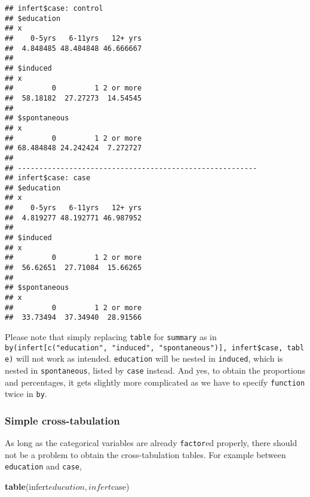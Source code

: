 \documentclass[]{book}
\newenvironment{Shaded}{\begin{snugshade}}{\end{snugshade}}
\newcommand{\KeywordTok}[1]{\textcolor[rgb]{0.13,0.29,0.53}{\textbf{{#1}}}}
\newcommand{\DecValTok}[1]{\textcolor[rgb]{0.00,0.00,0.81}{{#1}}}
\newcommand{\StringTok}[1]{\textcolor[rgb]{0.31,0.60,0.02}{{#1}}}
\newcommand{\NormalTok}[1]{{#1}}
\theoremstyle{definition}
\theoremstyle{definition}
\theoremstyle{remark}
\begin{document}
\begin{Shaded}
\end{Shaded}

\begin{verbatim}
## infert$case: control
## $education
## x
##    0-5yrs   6-11yrs   12+ yrs 
##  4.848485 48.484848 46.666667 
## 
## $induced
## x
##         0         1 2 or more 
##  58.18182  27.27273  14.54545 
## 
## $spontaneous
## x
##         0         1 2 or more 
## 68.484848 24.242424  7.272727 
## 
## -------------------------------------------------------- 
## infert$case: case
## $education
## x
##    0-5yrs   6-11yrs   12+ yrs 
##  4.819277 48.192771 46.987952 
## 
## $induced
## x
##         0         1 2 or more 
##  56.62651  27.71084  15.66265 
## 
## $spontaneous
## x
##         0         1 2 or more 
##  33.73494  37.34940  28.91566
\end{verbatim}

Please note that simply replacing \texttt{table} for \texttt{summary} as
in
\texttt{by(infert{[}c("education",\ "induced",\ "spontaneous"){]},\ infert\$case,\ table)}
will not work as intended. \texttt{education} will be nested in
\texttt{induced}, which is nested in \texttt{spontaneous}, listed by
\texttt{case} instead. And yes, to obtain the proportions and
percentages, it gets slightly more complicated as we have to specify
\texttt{function} twice in \texttt{by}.

\subsubsection{Simple cross-tabulation}\label{simple-cross-tabulation}

As long as the categorical variables are already \texttt{factor}ed
properly, there should not be a problem to obtain the cross-tabulation
tables. For example between \texttt{education} and \texttt{case},

\begin{Shaded}
\begin{Highlighting}[]
\KeywordTok{table}\NormalTok{(infert$education, infert$case)}
\end{Highlighting}
\end{Shaded}
\end{document}
